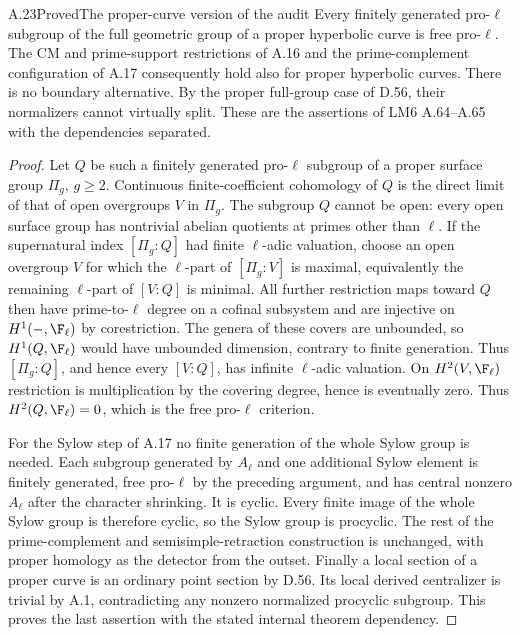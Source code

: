 \begin{statement}{A.23}{Proved}{The proper-curve version of the audit}
Every finitely generated pro-$\ell$ subgroup of the full
geometric group of a proper hyperbolic curve is free pro-$\ell$.
The CM and prime-support restrictions of A.16 and the
prime-complement configuration of A.17 consequently hold
also for proper hyperbolic curves. There is no boundary
alternative. By the proper full-group case of D.56, their
normalizers cannot virtually split. These are the assertions
of LM6 A.64--A.65 with the dependencies separated.
\end{statement}
\begin{proof}
Let $Q$ be such a finitely generated pro-$\ell$ subgroup of
a proper surface group $\Pi_g$, $g\ge2$.
Continuous finite-coefficient cohomology of $Q$ is the direct
limit of that of open overgroups $V$ in $\Pi_g$.
The subgroup $Q$ cannot be open: every open surface group has
nontrivial abelian quotients at primes other than $\ell$.
If the supernatural index $[\Pi_g:Q]$ had finite $\ell$-adic
valuation, choose an open overgroup $V$ for which the
$\ell$-part of $[\Pi_g:V]$ is maximal, equivalently the
remaining $\ell$-part of $[V:Q]$ is minimal. All further
restriction maps toward $Q$ then have prime-to-$\ell$ degree
on a cofinal subsystem and are injective on $H^1(-,\F_\ell)$
by corestriction. The genera of these covers are unbounded,
so $H^1(Q,\F_\ell)$ would have unbounded dimension, contrary
to finite generation. Thus $[\Pi_g:Q]$, and hence every
$[V:Q]$, has infinite $\ell$-adic valuation.
On $H^2(V,\F_\ell)$ restriction is
multiplication by the covering degree, hence is eventually
zero. Thus $H^2(Q,\F_\ell)=0$, which is the free pro-$\ell$
criterion.

For the Sylow step of A.17 no finite generation of the whole
Sylow group is needed. Each subgroup generated by $A_\ell$
and one additional Sylow element is finitely generated,
free pro-$\ell$ by the preceding argument, and has central
nonzero $A_\ell$ after the character shrinking. It is cyclic.
Every finite image of the whole Sylow group is therefore
cyclic, so the Sylow group is procyclic. The rest of the
prime-complement and semisimple-retraction construction is
unchanged, with proper homology as the detector from the
outset. Finally a local section of a proper curve is an
ordinary point section by D.56. Its local
derived centralizer is trivial by A.1, contradicting any
nonzero normalized procyclic subgroup. This proves the last
assertion with the stated internal theorem dependency.
\end{proof}

